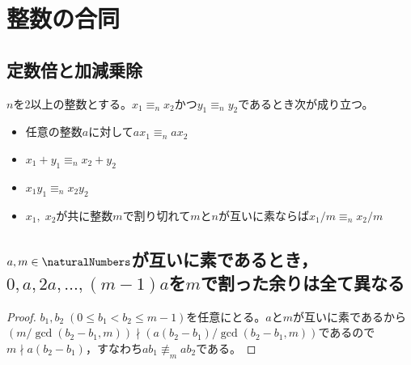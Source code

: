 \chapter{整数の合同}
    \section{定数倍と加減乗除}
        $n$を2以上の整数とする。$x_1\equiv_n x_2$かつ$y_1\equiv_n y_2$であるとき次が成り立つ。
        \begin{itemize}
            \item 任意の整数$a$に対して$a x_1 \equiv_n a x_2$
            \item $x_1+y_1 \equiv_n x_2+y_2$
            \item $x_1y_1 \equiv_n x_2y_2$
            \item $x_1,\;x_2$が共に整数$m$で割り切れて$m$と$n$が互いに素ならば$x_1/m \equiv_n x_2/m$
        \end{itemize}
    \section{\texorpdfstring{$a,m\in \naturalNumbers$}{自然数a,m}が互いに素であるとき，\texorpdfstring{$0,a,2a,\dotsc,(m-1)a$}{0,a,2a,...,(m-1)a}を\texorpdfstring{$m$}{m}で割った余りは全て異なる}
        \label{a,mが互いに素のとき，0,a,...a(m-1)をmで割った余りは全て異なる}
        \begin{proof}
            \quad\par
            $b_1,b_2\;(0 \leq b_1 < b_2 \leq m-1)$を任意にとる。$a$と$m$が互いに素であるから$(m/\gcd(b_2-b_1, m)) \nmid (a(b_2-b_1)/\gcd(b_2-b_1, m))$であるので$m \nmid a(b_2-b_1)$，すなわち$ab_1 \not \equiv_m ab_2$である。
        \end{proof}
